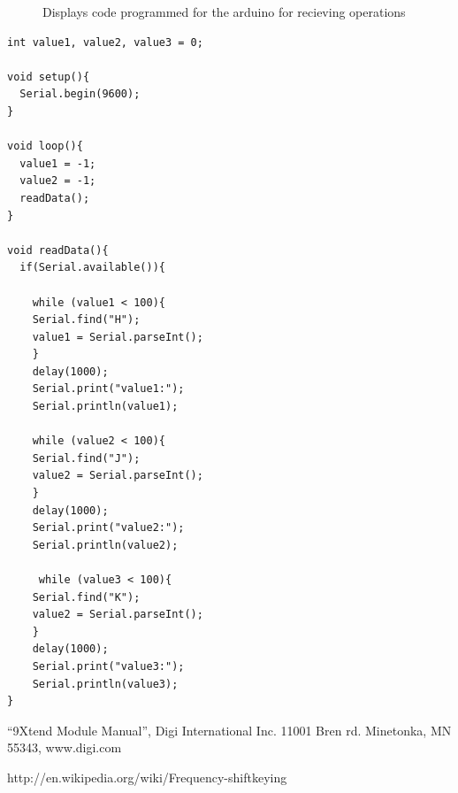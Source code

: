 \documentclass[paper=a4, fontsize=11pt]{scrartcl}
\numberwithin{equation}{section}		%
\numberwithin{figure}{section}			%
\numberwithin{table}{section}				%
\begin{document}
\begin{figure}[H]
\centering
\caption{Displays code programmed for the arduino for recieving operations}
\label{code2}
\end{figure}
\begin{verbatim}
int value1, value2, value3 = 0;

void setup(){
  Serial.begin(9600);
}

void loop(){
  value1 = -1;
  value2 = -1;
  readData();
}

void readData(){
  if(Serial.available()){
    
    while (value1 < 100){
    Serial.find("H");
    value1 = Serial.parseInt();
    }
    delay(1000);
    Serial.print("value1:");
    Serial.println(value1);
    
    while (value2 < 100){
    Serial.find("J");
    value2 = Serial.parseInt();
    }
    delay(1000);
    Serial.print("value2:");
    Serial.println(value2);
    
     while (value3 < 100){
    Serial.find("K");
    value2 = Serial.parseInt();
    }
    delay(1000);
    Serial.print("value3:");
    Serial.println(value3); 
}
\end{verbatim}


\begin{thebibliography}{99} %
``9Xtend Module Manual'', Digi International Inc. 11001 Bren rd. Minetonka, MN 55343, www.digi.com


http://en.wikipedia.org/wiki/Frequency-shiftkeying

 
\end{thebibliography}
\end{document}
